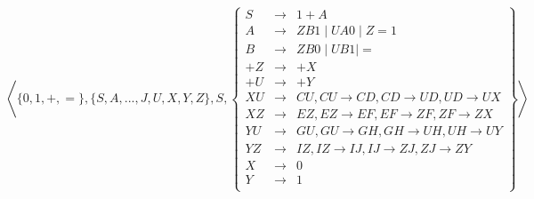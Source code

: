 \begin{exercice}
\begin{corrections}
    $$\left\langle \{0, 1, +, =\}, \{S, A, ..., J, U, X, Y, Z\}, S,
    \left\{\begin{array}{lll}
    S   &\rightarrow& 1 + A \\
    A &\rightarrow& Z B 1 \mid U A 0 \mid Z = 1 \\
    B &\rightarrow& Z B 0 \mid U B 1 \mid = \\
    +Z  &\rightarrow& +X \\
    +U  &\rightarrow& +Y \\
    XU &\rightarrow& CU, CU \rightarrow CD, CD \rightarrow UD, UD \rightarrow UX \\
    XZ &\rightarrow& EZ, EZ \rightarrow EF, EF \rightarrow ZF, ZF \rightarrow ZX \\
    YU &\rightarrow& GU, GU \rightarrow GH, GH \rightarrow UH, UH \rightarrow UY \\
    YZ &\rightarrow& IZ, IZ \rightarrow IJ, IJ \rightarrow ZJ, ZJ \rightarrow ZY \\
    X &\rightarrow& 0 \\
    Y &\rightarrow& 1 \\
    \end{array}\right\}\right\rangle$$
  \end{corrections}
  
\end{exercice}

\endgroup
\endinput
